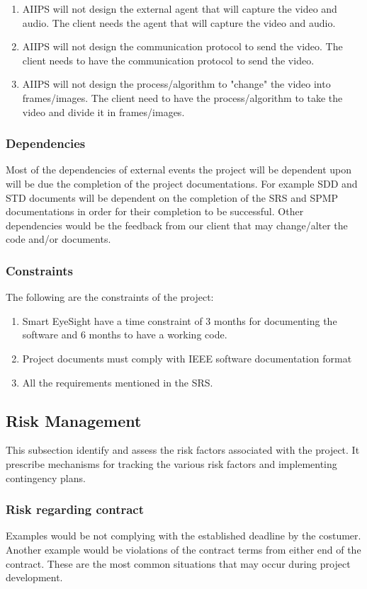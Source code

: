 \documentclass[12pt]{article}
\begin{document}
\begin{enumerate}
  \item AIIPS will not design the external agent that will capture the video and audio. The client needs the agent that will capture the video and audio.
  \item AIIPS will not design the communication protocol to send the video. The client needs to have the communication protocol to send the video.
  \item AIIPS will not design the process/algorithm to "change" the video into frames/images. The client need to have the process/algorithm to take the video and divide it in frames/images.
\end{enumerate}
\subsubsection{Dependencies}
Most of the dependencies of external events the project will be dependent upon will be due the completion of the project documentations. For example SDD and STD documents will be dependent on the completion of the SRS and SPMP documentations in order for their completion to be successful. Other dependencies would be the feedback from our client that may change/alter the code and/or documents.
\subsubsection{Constraints}
The following are the constraints of the project:
\begin{enumerate}
  \item Smart EyeSight have a time constraint of 3 months for documenting the software and 6 months to have a working code.
  \item Project documents must comply with IEEE software documentation format
  \item All the requirements mentioned in the SRS.
\end{enumerate}

\subsection{Risk Management}
This subsection identify and assess the risk factors associated with the project. It prescribe mechanisms for tracking the various risk factors and implementing contingency plans.

\subsubsection{Risk regarding contract}
  Examples would be not complying with the established deadline by the costumer. Another example would be violations of the contract terms from either end of the contract. These are the most common situations that may occur during project development.
\end{document}
